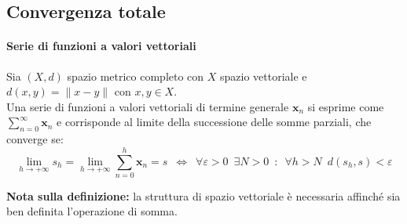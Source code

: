 \documentclass[10pt]{article}
\theoremstyle{plain}
\begin{document}
\subsection{Convergenza totale}

\paragraph{Serie di funzioni a valori vettoriali}
\begin{defin}
Sia $(X,d)$ spazio metrico completo con $X$ spazio vettoriale e $d(x, y) = \|x - y\|$ con $x, y \in X$.
\\Una serie di funzioni a valori vettoriali di termine generale $\mathbf{x}_n$ si esprime come $\displaystyle \sum\limits_{n=0}^\infty \mathbf{x}_n$ e corrisponde al limite della successione delle somme parziali, che converge se:
\[\lim\limits_{h \rightarrow +\infty} s_h = \lim\limits_{h \rightarrow +\infty} \sum\limits_{n=0}^h \mathbf{x}_n = s \enspace \Leftrightarrow \enspace \forall \varepsilon > 0 \enspace \exists N > 0 \enspace : \enspace \forall h > N \enspace d(s_h,s) < \varepsilon\]
\end{defin}
\textbf{Nota sulla definizione: } la struttura di spazio vettoriale è necessaria affinché sia ben definita l'operazione di somma.
\end{document}
